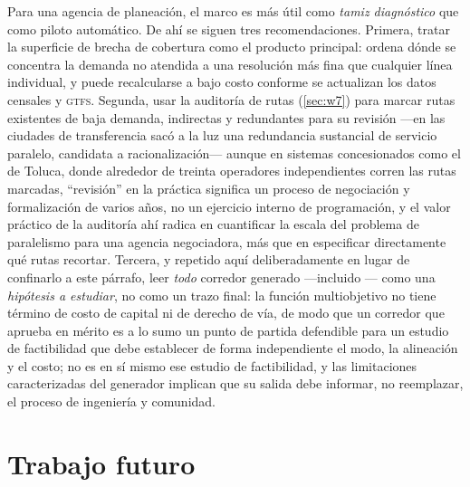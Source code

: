 Para una agencia de planeación, el marco es más útil como \emph{tamiz diagnóstico} que como
piloto automático. De ahí se siguen tres recomendaciones. Primera, tratar la superficie de
brecha de cobertura como el producto principal: ordena dónde se concentra la demanda no
atendida a una resolución más fina que cualquier línea individual, y puede recalcularse a
bajo costo conforme se actualizan los datos censales y \textsc{gtfs}. Segunda, usar la
auditoría de rutas (\cref{sec:w7}) para marcar rutas existentes de baja demanda, indirectas
y redundantes para su revisión ---en las ciudades de transferencia sacó a la luz una
redundancia sustancial de servicio paralelo, candidata a racionalización--- aunque en
sistemas concesionados como el de Toluca, donde alrededor de treinta operadores
independientes corren las rutas marcadas, ``revisión'' en la práctica significa un
proceso de negociación y formalización de varios años, no un ejercicio interno de
programación, y el valor práctico de la auditoría ahí radica en cuantificar la escala
del problema de paralelismo para una agencia negociadora, más que en especificar
directamente qué rutas recortar. Tercera, y repetido aquí deliberadamente en lugar de
confinarlo a este párrafo, leer \emph{todo} corredor generado ---incluido
--- como una \emph{hipótesis a estudiar}, no como un trazo final: la
función multiobjetivo no tiene término de costo de capital ni de derecho de vía, de
modo que un corredor que aprueba en mérito es a lo sumo un punto de partida defendible
para un estudio de factibilidad que debe establecer de forma independiente el modo, la
alineación y el costo; no es en sí mismo ese estudio de factibilidad, y las limitaciones
caracterizadas del generador implican que su salida debe informar, no reemplazar, el
proceso de ingeniería y comunidad.

\section{Trabajo futuro}
\label{sec:concl-futuro}

